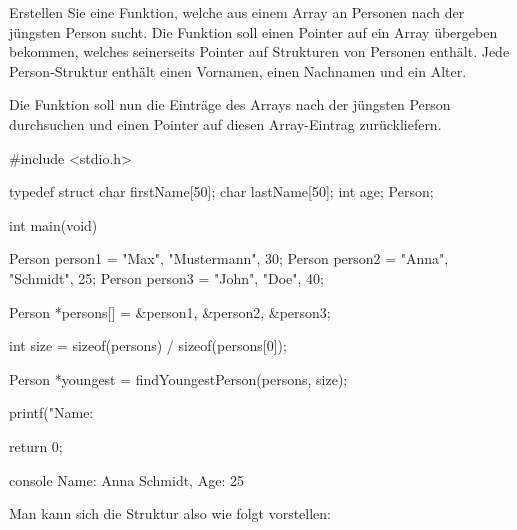 Erstellen Sie eine Funktion, welche aus einem Array an Personen nach der
jüngsten Person sucht. Die Funktion soll einen Pointer auf ein Array übergeben
bekommen, welches seinerseits Pointer auf Strukturen von Personen enthält. Jede
Person-Struktur enthält einen Vornamen, einen Nachnamen und ein Alter.

Die Funktion soll nun die Einträge des Arrays nach der jüngsten Person
durchsuchen und einen Pointer auf diesen Array-Eintrag zurückliefern.

\Vorlage
\begin{codebox}[lang=c, fontsize=\small]
#include <stdio.h>

typedef struct {
    char firstName[50];
    char lastName[50];
    int age;
} Person;

int main(void) {
    Person person1 = {"Max", "Mustermann", 30};
    Person person2 = {"Anna", "Schmidt", 25};
    Person person3 = {"John", "Doe", 40};

    Person *persons[] = {&person1, &person2, &person3};

    int size = sizeof(persons) / sizeof(persons[0]);

    Person *youngest = findYoungestPerson(persons, size);

    printf("Name: %

    return 0;
}
\end{codebox}

\begin{mybox}[Bildschirmausgabe]{console}
Name: Anna Schmidt, Age: 25
\end{mybox}


Man kann sich die Struktur also wie folgt vorstellen:

